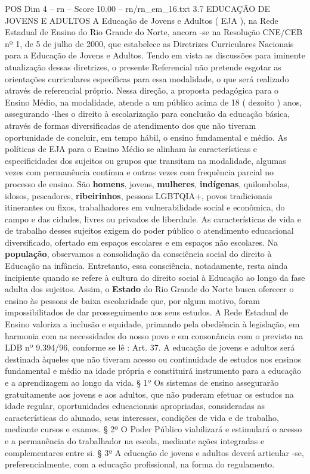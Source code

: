 \begin{textsample}{POS Dim 4 – rn – Score 10.00 – rn/rn\_em\_16.txt}  \label{ex:f4_pos_089}
3.7 EDUCAÇÃO DE JOVENS E ADULTOS A Educação de Jovens e Adultos ( EJA ), na Rede Estadual de Ensino do Rio Grande do Norte, ancora -se na Resolução CNE/CEB nº 1, de 5 de julho de 2000, que estabelece as Diretrizes Curriculares Nacionais para a Educação de Jovens e Adultos.
Tendo em vista as discussões para iminente atualização dessas diretrizes, o presente Referencial não pretende esgotar as orientações curriculares específicas para essa modalidade, o que será realizado através de referencial próprio.
Nessa direção, a proposta pedagógica para o Ensino Médio, na modalidade, atende a um público acima de 18 ( dezoito ) anos, assegurando -lhes o direito à escolarização para conclusão da educação básica, através de formas diversificadas de atendimento dos que não tiveram oportunidade de concluir, em tempo hábil, o ensino fundamental e médio.
As políticas de EJA para o Ensino Médio se alinham às características e especificidades dos sujeitos ou grupos que transitam na modalidade, algumas vezes com permanência contínua e outras vezes com frequência parcial no processo de ensino.
São \textbf{homens}, jovens, \textbf{mulheres}, \textbf{indígenas}, quilombolas, idosos, pescadores, \textbf{ribeirinhos}, pessoas LGBTQIA+, povos tradicionais itinerantes ou fixos, trabalhadores em vulnerabilidade social e econômica, do campo e das cidades, livres ou privados de liberdade.
As características de vida e de trabalho desses sujeitos exigem do poder público o atendimento educacional diversificado, ofertado em espaços escolares e em espaços não escolares.
Na \textbf{população}, observamos a consolidação da consciência social do direito à Educação na infância.
Entretanto, essa consciência, notadamente, resta ainda incipiente quando se refere à cultura do direito social à Educação ao longo da fase adulta dos sujeitos.
Assim, o \textbf{Estado} do Rio Grande do Norte busca oferecer o ensino às pessoas de baixa escolaridade que, por algum motivo, foram impossibilitados de dar prosseguimento aos seus estudos.
A Rede Estadual de Ensino valoriza a inclusão e equidade, primando pela obediência à legislação, em harmonia com as necessidades do nosso povo e em consonância com o previsto na LDB nº 9.394/96, conforme se lê : Art. 37.
A educação de jovens e adultos será destinada àqueles que não tiveram acesso ou continuidade de estudos nos ensinos fundamental e médio na idade própria e constituirá instrumento para a educação e a aprendizagem ao longo da vida. § 1º Os sistemas de ensino assegurarão gratuitamente aos jovens e aos adultos, que não puderam efetuar os estudos na idade regular, oportunidades educacionais apropriadas, consideradas as características do alunado, seus interesses, condições de vida e de trabalho, mediante cursos e exames. § 2º O Poder Público viabilizará e estimulará o acesso e a permanência do trabalhador na escola, mediante ações integradas e complementares entre si. § 3º A educação de jovens e adultos deverá articular -se, preferencialmente, com a educação profissional, na forma do regulamento.

\end{textsample}

